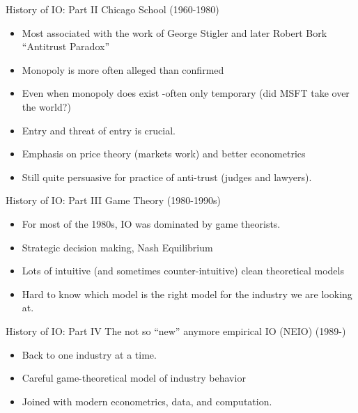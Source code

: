 \documentclass[xcolor=pdftex,dvipsnames,table,mathserif]{beamer}
\begin{document}
\begin{frame}{History of IO: Part II}
Chicago School (1960-1980)
\begin{itemize}
\item Most associated with the work of George Stigler and later Robert Bork ``Antitrust Paradox''
\item Monopoly is more often alleged than confirmed
\item Even when monopoly does exist -often only temporary (did MSFT take over the world?)
\item Entry and threat of entry is crucial.
\item Emphasis on price theory (markets work) and better econometrics
\item Still quite persuasive for practice of anti-trust (judges and lawyers).
\end{itemize}
\end{frame}


\begin{frame}{History of IO: Part III}
Game Theory (1980-1990s)
\begin{itemize}
\item For most of the 1980s, IO was dominated by game theorists.
\item Strategic decision making, Nash Equilibrium
\item Lots of intuitive (and sometimes counter-intuitive) clean theoretical models
\item Hard to know which model is the right model for the industry we are looking at.
\end{itemize}
\end{frame}


\begin{frame}{History of IO: Part IV}
The not so ``new'' anymore empirical IO (NEIO) (1989-)
\begin{itemize}
\item Back to one industry at a time.
\item Careful game-theoretical model of industry behavior
\item Joined with modern econometrics, data, and computation.
\end{itemize}
\end{frame}
\end{document}
